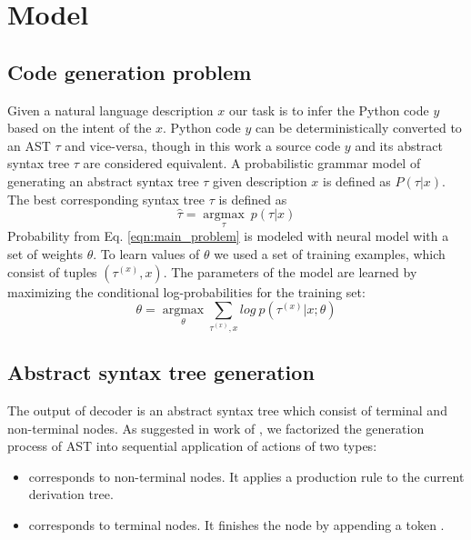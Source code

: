 \chapter{Model} 
\label{Chapter4}

\section{Code generation problem}
Given a natural language description $x$ our task is to infer the Python code $y$ based on the intent of the $x$. Python code $y$ can be deterministically converted to an AST $\tau$ and vice-versa, though in this work a source code $y$ and its abstract syntax tree $\tau$ are considered equivalent. A probabilistic grammar model of generating an abstract syntax tree $\tau$ given description $x$ is defined as $P(\tau|x)$. The best corresponding syntax tree $\tau$ is defined as
\begin{equation}
\hat{\tau}=\underset{\tau}{\operatorname{argmax}}\: p(\tau|x)
\label{eqn:main_problem}
\end{equation}
Probability from Eq. \ref{eqn:main_problem} is modeled with neural model with a set of weights $\theta$. To learn values of $\theta$ we used a set of training examples, which consist of tuples $(\tau^{(x)}, x)$. The parameters of the model are learned by maximizing the conditional log-probabilities for the training set:
\begin{equation}
\theta=\underset{\theta}{\operatorname{argmax}} \sum_{\tau^{(x)}, x} log \: p(\tau^{(x)}|x; \theta)
\label{eqn:mle}
\end{equation}

\section{Abstract syntax tree generation}
The output of decoder is an abstract syntax tree which consist of terminal and non-terminal nodes. As suggested in work of \cite{Yin2017}, we factorized the generation process of AST into sequential application of actions of two types:
\begin{itemize}
	\item {} corresponds to non-terminal nodes. It applies a production rule  to the current derivation tree.
	\item {} corresponds to terminal nodes. It finishes the node by appending a token .
\end{itemize}

